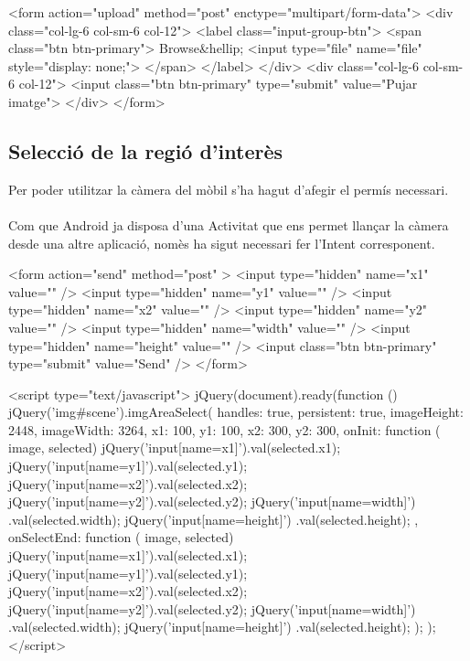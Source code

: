 		\begin{txt}
<form action="upload" method="post" 
	enctype="multipart/form-data">
	<div class="col-lg-6 col-sm-6 col-12">
		<label class="input-group-btn">
			<span class="btn btn-primary">
				Browse&hellip; <input type="file" 
					name="file" style="display: none;">
			</span>
		</label>
	</div>
	<div class="col-lg-6 col-sm-6 col-12">
		<input class="btn btn-primary" type="submit"
			value="Pujar imatge">
	</div>
</form>
		\end{txt}

	\subsection{Selecció de la regió d'interès}
		Per poder utilitzar la càmera del mòbil s'ha hagut d'afegir el permís necessari.\\\\
		Com que Android ja disposa d'una Activitat que ens permet llançar la càmera desde una altre aplicació, nomès ha sigut necessari fer l'Intent corresponent.\\
		\begin{txt}
<form action="send" method="post" >
	<input type="hidden" name="x1" value="" />
	<input type="hidden" name="y1" value="" />
	<input type="hidden" name="x2" value="" />
	<input type="hidden" name="y2" value="" />
	<input type="hidden" name="width" value="" />
	<input type="hidden" name="height" value="" />
	<input class="btn btn-primary" type="submit"
		value="Send" />
</form>

<script type="text/javascript">
	jQuery(document).ready(function () {
		jQuery('img#scene').imgAreaSelect({
			handles: true,
			persistent: true,
			imageHeight: 2448,
			imageWidth: 3264,
			x1: 100, y1: 100, x2: 300, y2: 300,
			onInit: function ( image, selected) {
				jQuery('input[name=x1]').val(selected.x1);
				jQuery('input[name=y1]').val(selected.y1);
				jQuery('input[name=x2]').val(selected.x2);
				jQuery('input[name=y2]').val(selected.y2);
				jQuery('input[name=width]')
					.val(selected.width);
				jQuery('input[name=height]')
					.val(selected.height);
			},
			onSelectEnd: function ( image, selected) {
				jQuery('input[name=x1]').val(selected.x1);
				jQuery('input[name=y1]').val(selected.y1);
				jQuery('input[name=x2]').val(selected.x2);
				jQuery('input[name=y2]').val(selected.y2);
				jQuery('input[name=width]')
					.val(selected.width);
				jQuery('input[name=height]')
					.val(selected.height);
			}
		});
	});
 </script>
		\end{txt}


